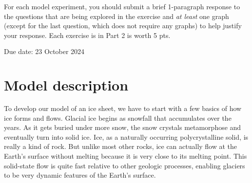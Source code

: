 \documentclass[11pt,letterpaper]{article}
\begin{document}
For each model experiment, you should submit a brief 1-paragraph response to the questions that are being explored in the exercise and \textit{at least} one graph (except for the last question, which does not require any graphs) to help justify your response. Each exercise is in Part 2 is worth 5 pts.

Due date: 23 October 2024


\section{Model description}
To develop our model of an ice sheet, we have to start with a few basics of how ice forms and flows. Glacial ice begins as snowfall that accumulates over the years. As it gets buried under more snow, the snow crystals metamorphose and eventually turn into solid ice. Ice, as a naturally occurring polycrystalline solid, is really a kind of rock. But unlike most other rocks, ice can actually flow at the Earth's surface without melting because it is very close to its melting point. This solid-state flow is quite fast relative to other geologic processes, enabling glaciers to be very dynamic features of the Earth's surface.
\end{document}
